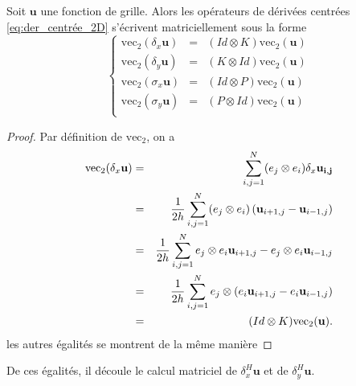 \begin{proposition}
Soit $\mathbf{u}$ une fonction de grille. Alors les opérateurs de dérivées centrées \eqref{eq:der_centrée_2D} s'écrivent matriciellement sous la forme
\begin{equation}
\left\lbrace
\begin{array}{rcl}
\text{vec}_2(\delta_x \mathbf{u}) & = & (Id \otimes K) \text{vec}_2(\mathbf{u})\\
\text{vec}_2(\delta_y \mathbf{u}) & = & (K \otimes Id) \text{vec}_2(\mathbf{u})\\
\text{vec}_2(\sigma_x \mathbf{u}) & = & (Id \otimes P) \text{vec}_2(\mathbf{u})\\
\text{vec}_2(\sigma_y \mathbf{u}) & = & (P \otimes Id) \text{vec}_2(\mathbf{u})\\
\end{array}\right.
\end{equation}
\label{prop:op_der_simpson_mat}
\end{proposition}

\begin{proof}
Par définition de $\text{vec}_2$, on a 
\begin{eqnarray}
\text{vec}_2 (\delta_x \mathbf{u}) &=& \displaystyle\sum\limits_{i,j=1}^N (e_j \otimes e_i) \delta_x \mathbf{u_{i,j}} \\
	&=& \dfrac{1}{2h} \displaystyle\sum\limits_{i,j=1}^N (e_j \otimes e_i) \left( \mathbf{u}_{i+1,j} - \mathbf{u}_{i-1,j} \right) \\
	&=& \dfrac{1}{2h} \displaystyle\sum\limits_{i,j=1}^N e_j \otimes e_i \mathbf{u}_{i+1,j} - e_j \otimes e_i \mathbf{u}_{i-1,j}\\
	&=& \dfrac{1}{2h} \displaystyle\sum\limits_{i,j=1}^N e_j \otimes (e_i \mathbf{u}_{i+1,j}-e_i \mathbf{u}_{i-1,j}) \\
	&=& (Id \otimes K) \text{vec}_2(\mathbf{u}).
\end{eqnarray}
les autres égalités se montrent de la même manière
\end{proof}

De ces égalités, il découle le calcul matriciel de $\delta_x^H \mathbf{u}$ et de $\delta_y^H \mathbf{u}$.

